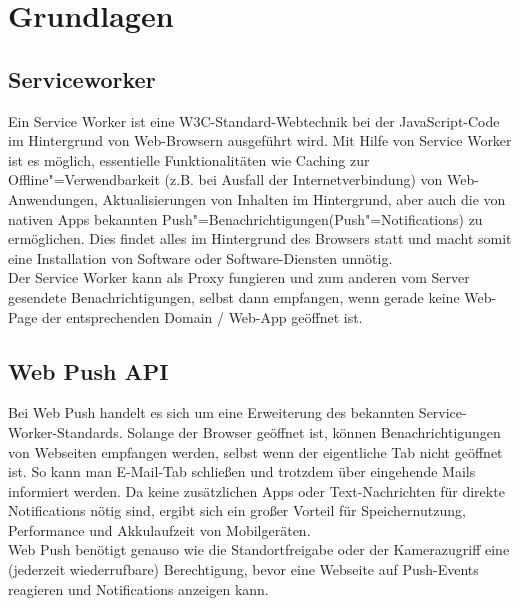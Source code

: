\chapter{Grundlagen}

\section{Serviceworker}
\label{sec_grundladge_serviceworker}

Ein Service Worker ist eine W3C-Standard-Webtechnik bei der JavaScript-Code im Hintergrund von Web-Browsern ausgeführt wird. Mit Hilfe von Service Worker ist es möglich, essentielle Funktionalitäten wie Caching zur Offline"=Verwendbarkeit (z.B. bei Ausfall der Internetverbindung) von Web-Anwendungen, Aktualisierungen von Inhalten im Hintergrund, aber auch die von nativen Apps bekannten Push"=Benachrichtigungen(Push"=Notifications) zu ermöglichen. Dies findet alles im Hintergrund des Browsers statt und macht somit eine Installation von Software oder Software-Diensten unnötig.\\

Der Service Worker kann als Proxy fungieren und zum anderen vom Server gesendete Benachrichtigungen, selbst dann empfangen, wenn gerade keine Web-Page der entsprechenden Domain / Web-App geöffnet ist. 


\section{Web Push API}
\label{sec_grundlagen_web-push}
    
Bei Web Push handelt es sich um eine Erweiterung des bekannten Service-Worker-Standards. Solange der Browser geöffnet ist, können Benachrichtigungen von Webseiten empfangen werden, selbst wenn der eigentliche Tab nicht geöffnet ist. So kann man E-Mail-Tab schließen und trotzdem über eingehende Mails informiert werden. Da keine zusätzlichen Apps oder Text-Nachrichten für direkte Notifications nötig sind, ergibt sich ein großer Vorteil für Speichernutzung, Performance und Akkulaufzeit von Mobilgeräten. \\
Web Push benötigt genauso wie die Standortfreigabe oder der Kamerazugriff eine (jederzeit wiederrufbare) Berechtigung, bevor eine Webseite auf Push-Events reagieren und Notifications anzeigen kann. \\

